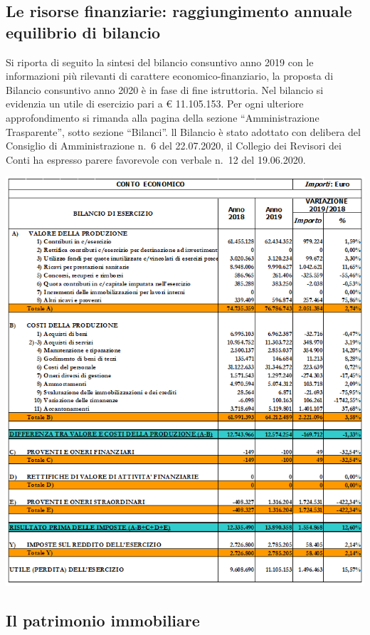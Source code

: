 \documentclass[
  12pt,
]{article}
\begin{document}
\hypertarget{le-risorse-finanziarie-raggiungimento-annuale-equilibrio-di-bilancio}{%
\subsection{Le risorse finanziarie: raggiungimento annuale equilibrio di
bilancio}\label{le-risorse-finanziarie-raggiungimento-annuale-equilibrio-di-bilancio}}

Si riporta di seguito la sintesi del bilancio consuntivo anno 2019 con
le informazioni più rilevanti di carattere economico-finanziario, la
proposta di Bilancio consuntivo anno 2020 è in fase di fine istruttoria.
Nel bilancio si evidenzia un utile di esercizio pari a € 11.105.153. Per
ogni ulteriore approfondimento si rimanda alla pagina della sezione
``Amministrazione Trasparente'', sotto sezione ``Bilanci''. ll Bilancio
è stato adottato con delibera del Consiglio di Amministrazione n.~6 del
22.07.2020, il Collegio dei Revisori dei Conti ha espresso parere
favorevole con verbale n.~12 del 19.06.2020.

\begin{center}\includegraphics[width=0.9\linewidth]{figure/f6} \end{center}

\hypertarget{il-patrimonio-immobiliare}{%
\subsection{Il patrimonio immobiliare}\label{il-patrimonio-immobiliare}}
\end{document}
